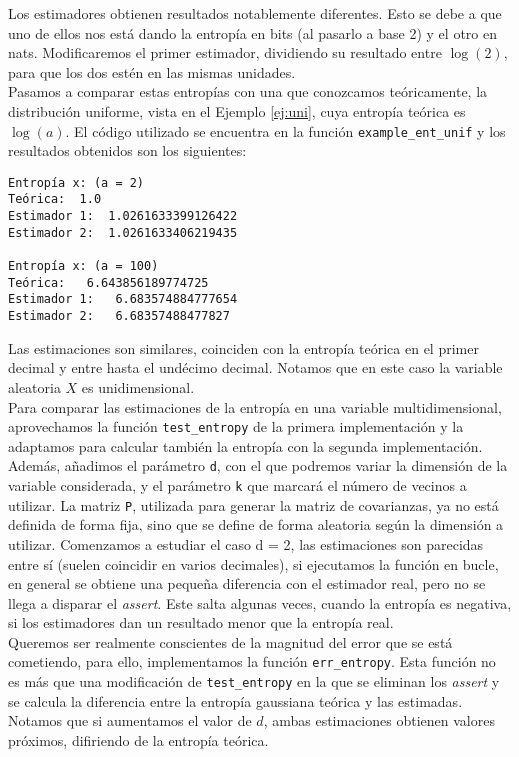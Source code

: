 \documentclass[12pt,a4paper]{report} %
\theoremstyle{definition}
\begin{document}
Los estimadores obtienen resultados notablemente diferentes. Esto se debe a que uno de ellos nos está dando la entropía en bits (al pasarlo a base 2) y el otro en nats. Modificaremos el primer estimador, dividiendo su resultado entre $\log(2)$, para que los dos estén en las mismas unidades.\\

Pasamos a comparar estas entropías con una que conozcamos teóricamente, la distribución uniforme, vista en el Ejemplo \ref{ej:uni}, cuya entropía teórica es $\log(a)$. El código utilizado se encuentra en la función \texttt{example\_ent\_unif} y los resultados obtenidos son los siguientes:

\begin{lstlisting}
Entropía x: (a = 2)
Teórica:  1.0
Estimador 1:  1.0261633399126422
Estimador 2:  1.0261633406219435

Entropía x: (a = 100)
Teórica:   6.643856189774725
Estimador 1:   6.683574884777654
Estimador 2:   6.68357488477827

\end{lstlisting}

Las estimaciones son similares, coinciden con la entropía teórica en el primer decimal y entre hasta el undécimo decimal. Notamos que en este caso la variable aleatoria $X$ es unidimensional.\\

Para comparar las estimaciones de la entropía en una variable multidimensional, aprovechamos la función \texttt{test\_entropy} de la primera implementación y la adaptamos para calcular también la entropía con la segunda implementación. Además, añadimos el parámetro \texttt{d}, con el que podremos variar la dimensión de la variable considerada, y el parámetro \texttt{k} que marcará el número de vecinos a utilizar. La matriz \texttt{P}, utilizada para generar la matriz de covarianzas, ya no está definida de forma fija, sino que se define de forma aleatoria según la dimensión a utilizar. Comenzamos a estudiar el caso d = 2, las estimaciones son parecidas entre sí (suelen coincidir en varios decimales), si ejecutamos la función en bucle, en general se obtiene una pequeña diferencia con el estimador real, pero no se llega a disparar el \textit{assert}. Este salta algunas veces, cuando la entropía es negativa, si los estimadores dan un resultado menor que la entropía real.\\

Queremos ser realmente conscientes de la magnitud del error que se está cometiendo, para ello, implementamos la función \texttt{err\_entropy}. Esta función no es más que una modificación de \texttt{test\_entropy} en la que se eliminan los \textit{assert} y se calcula la diferencia entre la entropía gaussiana teórica y las estimadas. Notamos que si aumentamos el valor de $d$, ambas estimaciones obtienen valores próximos, difiriendo de la entropía teórica.\\
\end{document}
